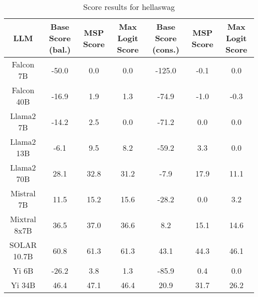 \renewcommand\arraystretch{1.2}
\begin{table*}
\centering
\begin{tabular}{c|c|c|c|c|c|c}
LLM & Base Score (bal.) & MSP Score & Max Logit Score & Base Score (cons.) & MSP Score & Max Logit Score\\ \hline
Falcon 7B & -50.0 & 0.0 & 0.0 & -125.0 & -0.1 & 0.0\\
Falcon 40B & -16.9 & 1.9 & 1.3 & -74.9 & -1.0 & -0.3\\
Llama2 7B & -14.2 & 2.5 & 0.0 & -71.2 & 0.0 & 0.0\\
Llama2 13B & -6.1 & 9.5 & 8.2 & -59.2 & 3.3 & 0.0\\
Llama2 70B & 28.1 & 32.8 & 31.2 & -7.9 & 17.9 & 11.1\\
Mistral 7B & 11.5 & 15.2 & 15.6 & -28.2 & 0.0 & 3.2\\
Mixtral 8x7B & 36.5 & 37.0 & 36.6 & 8.2 & 15.1 & 14.6\\
SOLAR 10.7B & 60.8 & 61.3 & 61.3 & 43.1 & 44.3 & 46.1\\
Yi 6B & -26.2 & 3.8 & 1.3 & -85.9 & 0.4 & 0.0\\
Yi 34B & 46.4 & 47.1 & 46.4 & 20.9 & 31.7 & 26.2\\
\hline
\end{tabular}
\caption{Score results for hellaswag}
\end{table*}
\label{tab:hellaswag_score}
